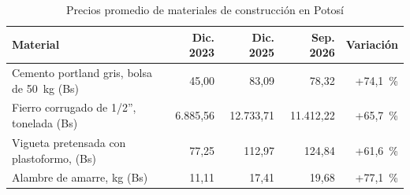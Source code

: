 \begin{table}[H]
\caption{Precios promedio de materiales de construcción en Potosí}
\label{tab:precios}
\begin{tabularx}{\linewidth}{@{}Lrrrr@{}}
\toprule
\textbf{Material} & \textbf{Dic. 2023} & \textbf{Dic. 2025} & \textbf{Sep. 2026} & \textbf{Variación} \\
\midrule
Cemento portland gris, bolsa de 50~kg (Bs) & 45,00 & 83,09 & 78,32 & +74,1~\% \\
Fierro corrugado de 1/2'', tonelada (Bs) & 6.885,56 & 12.733,71 & 11.412,22 & +65,7~\% \\
Vigueta pretensada con plastoformo, \mdos{} (Bs) & 77,25 & 112,97 & 124,84 & +61,6~\% \\
Alambre de amarre, kg (Bs) & 11,11 & 17,41 & 19,68 & +77,1~\% \\
\bottomrule
\end{tabularx}
\end{table}

